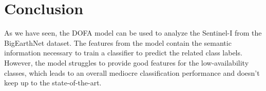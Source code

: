 \section{Conclusion}
\label{sec:conclusion}


As we have seen, the DOFA model can be used to analyze the Sentinel-I from the BigEarthNet dataset. The features from the model contain the semantic information necessary to train a classifier to predict the related class labels. However, the model struggles to provide good features for the low-availability classes, which leads to an overall mediocre classification performance and doesn't keep up to the state-of-the-art.